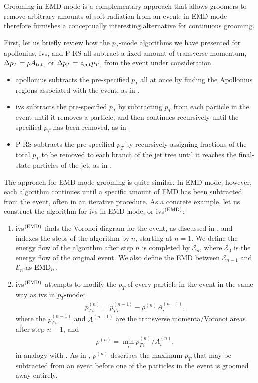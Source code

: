 \begin{subappendices}
Grooming in EMD mode is a complementary approach that allows \PIRANHA{} groomers to remove arbitrary amounts of soft radiation from an event.
%
\PIRANHA{} in EMD mode therefore furnishes a conceptually interesting alternative for continuous grooming.

First, let us briefly review how the \(p_T\)-mode algorithms we have presented for \gls{apollonius}, \gls{ivs}, and P-RS all subtract a fixed amount of transverse momentum, \(\Delta p_T = \rho A_{\rm tot}\), or \(\Delta p_T = z_{\rm cut} p_T\), from the event under consideration.
%
\begin{itemize}
\item
\gls{apollonius} subtracts the pre-specified \(p_T\) all at once by finding the Apollonius regions associated with the event, as in .
%
\item
\gls{ivs} subtracts the pre-specified \(p_T\) by subtracting \(p_T\) from each particle in the event until it removes a particle, and then continues recursively until the specified \(p_T\) has been removed, as in .
%
\item
P-RS subtracts the pre-specified \(p_T\) by recursively assigning fractions of the total \(p_T\) to be removed to each branch of the jet tree until it reaches the final-state particles of the jet, as in .
\end{itemize}


The approach for EMD-mode grooming is quite similar.
%
In EMD mode, however, each algorithm continues until a specific amount of EMD has been subtracted from the event, often in an iterative procedure.
%
As a concrete example, let us construct the algorithm for \gls{ivs} in EMD mode, or \gls{ivs}\(^{(\rm EMD)}\):
%
\begin{enumerate}
    \item
    \gls{ivs}\(^{(\rm EMD)}\) finds the Voronoi diagram for the event, as discussed in , and indexes the steps of the algorithm by \(n\), starting at \(n=1\).
    We define the energy flow of the algorithm after step \(n\) is completed by \(\mathcal{E}_n\), where \(\mathcal{E}_0\) is the energy flow of the original event.
    We also define the EMD between \(\mathcal{E}_{n-1}\) and \(\mathcal{E}_n\) as \({\rm EMD}_n\).

    \item
    \gls{ivs}\(^{(\rm EMD)}\) attempts to modify the \(p_T\) of every particle in the event in the same way as \gls{ivs} in \(p_T\)-mode:
    \begin{align}
	p_{T\,i}^{(n)} = p_{T\,i}^{(n-1)} - \rho^{(n)} A^{(n-1)}_i,
	\label{eq:ivs_emd}
    \end{align}
    where the \(p_{T\,i}^{(n-1)}\) and \(A^{(n-1)}\) are the transverse momenta/Voronoi areas after step \(n-1\), and
    \begin{align}
        \rho^{(n)}
        =
        \min_i p^{(n)}_{T\,i}/A^{(n)}_i
        ,
    \end{align}
    in analogy with .
    As in , \(\rho^{(n)}\) describes the maximum \(p_T\) that may be subtracted from an event before one of the particles in the event is groomed away entirely.


\end{enumerate}
\end{subappendices}
